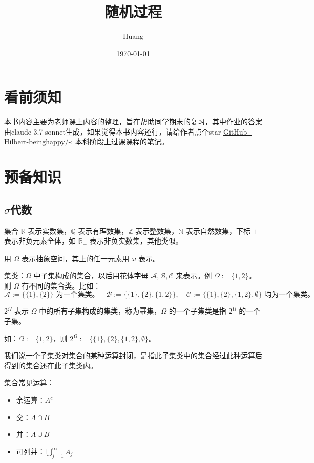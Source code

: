 \documentclass[lang=cn,10pt,thmcnt=section]{elegantbook}
\title{随机过程}
\author{Huang}
\date{\today}
\begin{document}
	
	\maketitle
	\frontmatter
	
	\tableofcontents
	
	\mainmatter
	\chapter{看前须知}
	本书内容主要为老师课上内容的整理，旨在帮助同学期末的复习，其中作业的答案由claude-3.7-sonnet生成，如果觉得本书内容还行，请给作者点个star
	\href{https://github.com/Hilbert-beinghappy/-}{GitHub - Hilbert-beinghappy/-: 本科阶段上过课课程的笔记}。

	
	\chapter{预备知识}
	\section{$\sigma$代数}
	集合 \(\mathbb{R}\) 表示实数集，\(\mathbb{Q}\) 表示有理数集，\(\mathbb{Z}\) 表示整数集，\(\mathbb{N}\) 表示自然数集，下标 \(+\) 表示非负元素全体，如 \(\mathbb{R}_+\) 表示非负实数集，其他类似。

	用 \(\Omega\) 表示抽象空间，其上的任一元素用 \(\omega\) 表示。

集类：\(\Omega\) 中子集构成的集合，以后用花体字母 \(\mathscr{A}, \mathscr{B}, \mathscr{C}\) 来表示。例 \(\Omega := \{1,2\}\)。则 \(\Omega\) 有不同的集合类。比如：
\[
\mathscr{A} := \{\{1\},\{2\}\} \text{ 为一个集类。} \quad
\mathscr{B} := \{\{1\},\{2\},\{1,2\}\}, \quad
\mathscr{C} := \{\{1\},\{2\},\{1,2\},\emptyset\} \text{ 均为一个集类。}
\]

\(2^\Omega\) 表示 \(\Omega\) 中的所有子集构成的集类，称为幂集，\(\Omega\) 的一个子集类是指 \(2^\Omega\) 的一个子集。

如：\(\Omega := \{1,2\}\)，则 \(2^\Omega := \{\{1\},\{2\},\{1,2\},\emptyset\}\)。

我们说一个子集类对集合的某种运算封闭，是指此子集类中的集合经过此种运算后得到的集合还在此子集类内。

集合常见运算：
\begin{itemize}
    \item 余运算：\(A^c\)
    \item 交：\(A \cap B\)
    \item 并：\(A \cup B\)
    \item 可列并：\(\bigcup_{j=1}^{\infty} A_j\)
\end{itemize}
\end{document}
